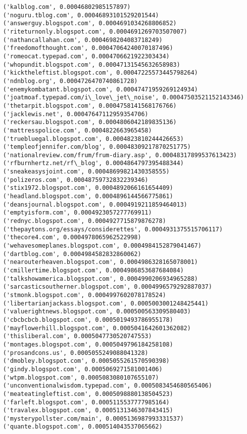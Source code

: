 \documentclass[11pt]{article}
\begin{document}
\begin{Verbatim}[commandchars=\\\{\}]
('kalblog.com', 0.00046802985157897)
('noguru.tblog.com', 0.00046893101529201544)
('answerguy.blogspot.com', 0.0004691034268806852)
('riteturnonly.blogspot.com', 0.0004691269703507007)
('nathancallahan.com', 0.0004698204083718249)
('freedomofthought.com', 0.00047064240070187496)
('romeocat.typepad.com', 0.0004706621922303434)
('whopundit.blogspot.com', 0.00047131545632658983)
('kicktheleftist.blogspot.com', 0.00047225573445798264)
('ndnblog.org', 0.0004726470740861728)
('enemykombatant.blogspot.com', 0.00047471959269124934)
('joatmoaf.typepad.com/i\_love\_jet\_noise', 0.00047503521152143346)
('thetarpit.blogspot.com', 0.0004758141568176766)
('jacklewis.net', 0.00047647112959354706)
('reckersau.blogspot.com', 0.0004806042189835136)
('mattresspolice.com', 0.0004822663965458)
('truebluegal.blogspot.com', 0.0004823810244426653)
('templeofjennifer.com/blog', 0.00048309217870251775)
('nationalreview.com/frum/frum-diary.asp', 0.00048317899537613423)
('rfburnhertz.net/rf\_blog', 0.0004864797395488344)
('sneakeasysjoint.com', 0.00048699821430358555)
('polizeros.com', 0.00048759732832239346)
('stix1972.blogspot.com', 0.0004892066161654409)
('headland.blogspot.com', 0.0004896144566775861)
('deansjournal.blogspot.com', 0.0004919211859464013)
('emptyisform.com', 0.0004923057277769911)
('rednyc.blogspot.com', 0.0004927715879876278)
('thepaytons.org/essays/considerettes', 0.0004931375515706117)
('thecore4.com', 0.0004978065962522998)
('wehavesomeplanes.blogspot.com', 0.0004984152879041467)
('dartblog.com', 0.0004984582832860062)
('nearouterheaven.blogspot.com', 0.0004986328165078001)
('cmillertime.blogspot.com', 0.0004986853687684084)
('talkshowamerica.blogspot.com', 0.0004990206934965288)
('sarcasticsoutherner.blogspot.com', 0.0004996579292887037)
('stmonk.blogspot.com', 0.0004997602078178524)
('libertarianjackass.blogspot.com', 0.0005003001248425441)
('valuerightnews.blogspot.com', 0.000500563309580403)
('cbcbcbcb.blogspot.com', 0.0005019493786955178)
('mayflowerhill.blogspot.com', 0.0005041642601362082)
('thisliberal.com', 0.0005047730520747553)
('montages.blogspot.com', 0.0005049796184258108)
('prosandcons.us', 0.0005055249088041328)
('dmobley.blogspot.com', 0.0005055261570590398)
('gindy.blogspot.com', 0.0005069271581001406)
('wtpm.blogspot.com', 0.0005083080107655107)
('unconventionalwisdom.typepad.com', 0.0005083454680565406)
('meateatingleftist.com', 0.0005098880138504523)
('farleft.blogspot.com', 0.0005115537777985164)
('travalex.blogspot.com', 0.0005131346307843415)
('mysterypollster.com/main', 0.0005136987993331537)
('quante.blogspot.com', 0.000514043537065662)

\end{Verbatim}
\end{document}
